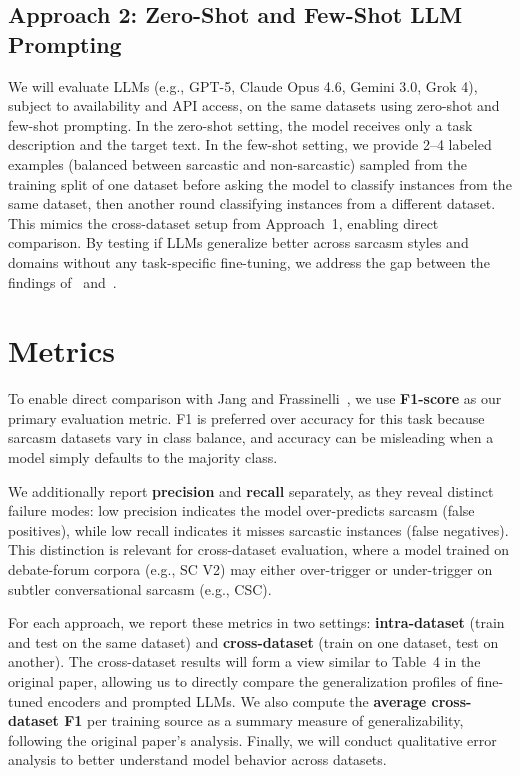 \documentclass[sigconf, nonacm]{acmart}
\begin{document}
\subsection{Approach 2: Zero-Shot and Few-Shot LLM Prompting}

We will evaluate LLMs (e.g., GPT-5, Claude Opus 4.6, Gemini 3.0, Grok 4), subject to availability and API access, on the same datasets using zero-shot and few-shot prompting. In the zero-shot setting, the model receives only a task description and the target text. In the few-shot setting, we provide 2--4 labeled examples (balanced between sarcastic and non-sarcastic) sampled from the training split of one dataset before asking the model to classify instances from the same dataset, then another round classifying instances from a different dataset. This mimics the cross-dataset setup from Approach~1, enabling direct comparison. By testing if LLMs generalize better across sarcasm styles and domains without any task-specific fine-tuning, we address the gap between the findings of~\cite{jang2024generalizablesarcasmdetectionjust} and~\cite{zhang2024sarcasmbench}.

\section{Metrics}

To enable direct comparison with Jang and
Frassinelli~\cite{jang2024generalizablesarcasmdetectionjust}, we use \textbf{F1-score} as our primary evaluation metric. F1 is preferred over accuracy for this task because sarcasm datasets vary in class balance, and accuracy can be misleading when a model simply defaults to the majority class.

We additionally report \textbf{precision} and \textbf{recall} separately, as they reveal distinct failure modes: low precision indicates the model over-predicts sarcasm (false positives), while low recall indicates it misses sarcastic instances (false negatives). This distinction is relevant for cross-dataset evaluation, where a model trained on debate-forum corpora (e.g., SC V2) may either over-trigger or under-trigger on subtler conversational sarcasm (e.g., CSC).

For each approach, we report these metrics in two settings: \textbf{intra-dataset} (train and test on the same dataset) and \textbf{cross-dataset} (train on one dataset, test on another). The cross-dataset results will form a view similar to Table~4 in the original paper, allowing us to directly compare the generalization profiles of fine-tuned encoders and prompted LLMs. We also compute the \textbf{average cross-dataset F1} per training source as a summary measure of generalizability, following the original paper's analysis. Finally, we will conduct qualitative error analysis to better understand model behavior across datasets.
\end{document}
